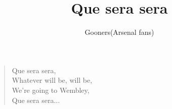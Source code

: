 \documentclass[a4paper,12pt]{article}
\title{Que sera sera}
\author{Gooners(Arsenal fans)}
\date{}
\begin{document}
	
	\maketitle
	
	\begin{verse}
		
		Que sera sera, \\
		Whatever will be, will be, \\
		We're going to Wembley, \\
		Que sera sera$\ldots$
		
	\end{verse}
	
\end{document}
